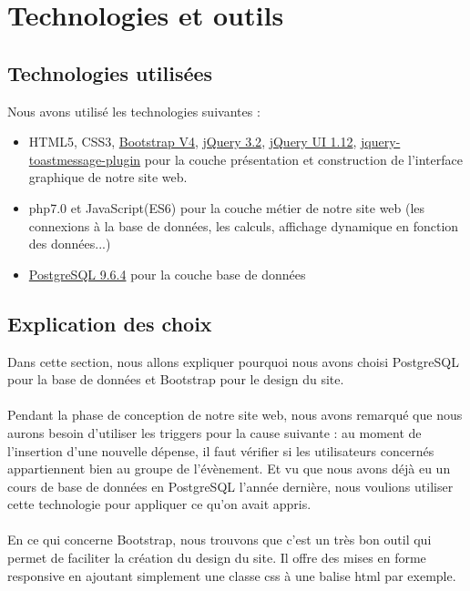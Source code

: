 \documentclass[a4paper, 11pt]{article}
\begin{document}
\section{Technologies et outils}

\subsection{Technologies utilisées}
Nous avons utilisé les technologies suivantes :
\begin{itemize}
	\item HTML5, CSS3, \href{http://getbootstrap.com/}{Bootstrap V4}, \href{https://jquery.org/}{jQuery 3.2}, 
	\href{https://jqueryui.com/}{jQuery UI 1.12}, \href{http://akquinet.github.io/jquery-toastmessage-plugin/}{jquery-toastmessage-plugin} pour la couche présentation et construction de l'interface graphique de notre site web.
	\item php7.0 et JavaScript(ES6) pour la couche métier de notre site web (les connexions à la base de données, les
	calculs, affichage dynamique en fonction des données...)
	\item \href{https://www.postgresql.org/}{PostgreSQL 9.6.4} pour la couche base de données
\end{itemize}

\subsection{Explication des choix}
Dans cette section, nous allons expliquer pourquoi nous avons choisi PostgreSQL pour la base de données et Bootstrap pour le design du site.
\paragraph{} Pendant la phase de conception de notre site web, nous avons remarqué que nous aurons besoin d'utiliser les triggers pour la cause suivante : au moment de l'insertion d'une nouvelle dépense, il faut vérifier si les utilisateurs concernés appartiennent bien au groupe de l'évènement. Et vu que nous avons déjà eu un cours de base de données en PostgreSQL l'année dernière, nous voulions utiliser cette technologie pour appliquer ce qu'on avait appris.
\paragraph{} En ce qui concerne Bootstrap, nous trouvons que c'est un très bon outil qui permet de faciliter la création du design du site. Il offre des mises en forme responsive en ajoutant simplement une classe css à une balise html par exemple.
\end{document}
